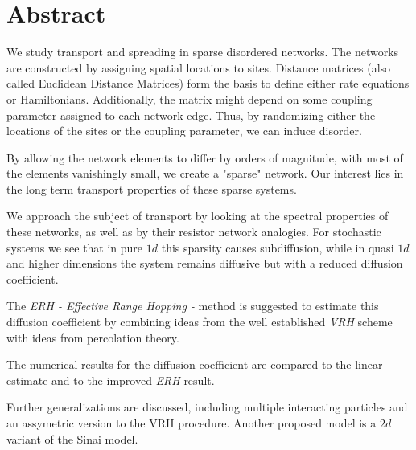 \chapter*{Abstract}


We study transport and spreading in sparse disordered networks. The networks are 
constructed by assigning spatial locations to sites. Distance matrices (also called
Euclidean Distance Matrices) form the basis to define either rate equations or Hamiltonians.
Additionally, the matrix might depend on some coupling parameter assigned to each network edge.
Thus, by randomizing either the locations of the sites
or the coupling parameter, we can induce disorder.



By allowing the network elements to differ by orders of magnitude,
with most of the elements vanishingly small, we create a "sparse" network.
Our interest lies in the long term transport properties of these sparse systems. 


We approach the subject of transport by looking at the spectral properties
of these networks, as well as by their resistor network analogies. For stochastic systems we see 
that in pure $1d$ this sparsity causes subdiffusion, while in quasi $1d$ and
higher dimensions the system remains diffusive but with a reduced diffusion coefficient. 


The \emph{ERH - Effective Range Hopping -} method is suggested to estimate this diffusion 
coefficient by combining ideas from the well established \emph{VRH} scheme with 
ideas from percolation theory.


The numerical results for the diffusion coefficient are compared to the linear
estimate and to the improved \emph{ERH} result.


Further generalizations are discussed, including multiple interacting particles and
an assymetric version to the VRH procedure. Another proposed model is a $2d$ variant of 
the Sinai model.
